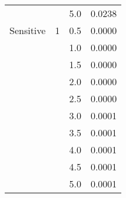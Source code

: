\begin{tabular}{lllr}
          &     & 5.0 & 0.0238 \\
Sensitive & 1   & 0.5 & 0.0000 \\
          &     & 1.0 & 0.0000 \\
          &     & 1.5 & 0.0000 \\
          &     & 2.0 & 0.0000 \\
          &     & 2.5 & 0.0000 \\
          &     & 3.0 & 0.0001 \\
          &     & 3.5 & 0.0001 \\
          &     & 4.0 & 0.0001 \\
          &     & 4.5 & 0.0001 \\
          &     & 5.0 & 0.0001 \\
\bottomrule
\end{tabular}
